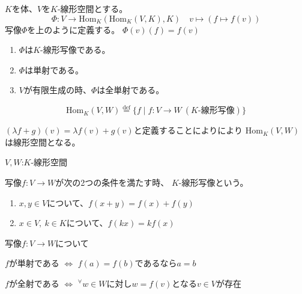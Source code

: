 \documentclass[12pt,b5paper]{ltjsarticle}
\begin{document}
$K$を体、$V$を$K$-線形空間とする。
\begin{equation}
 \Phi : V \rightarrow \mathrm{Hom}_K(\mathrm{Hom}_K(V,K),K)
  \quad
  v \mapsto (f\mapsto f(v))
\end{equation}
写像$\Phi$を上のように定義する。
$\Phi (v) (f) = f(v)$
\begin{enumerate}
 \item $\Phi$は$K$-線形写像である。
 \item $\Phi$は単射である。
 \item $V$が有限生成の時、$\Phi$は全単射である。
\end{enumerate}

\hrulefill

\begin{equation}
 \mathrm{Hom}_K(V,W)
  \stackrel{\mathrm{def}}{=}
  \{ f \mid f:V\rightarrow W \ (K\text{-線形写像}) \}
\end{equation}

$(\lambda f + g)(v) = \lambda f(v)+g(v)$と定義することによりにより
$\mathrm{Hom}_K(V,W)$は線形空間となる。


\dotfill

$V,W$:$K$-線形空間

写像$f: V\rightarrow W$が次の2つの条件を満たす時、
$K$-線形写像という。
\begin{enumerate}
 \item $x,y\in V$について、$f(x+y)=f(x)+f(y)$
 \item $x\in V,\ k\in K$について、$f(kx)=kf(x)$
\end{enumerate}

\dotfill

写像$f:V\rightarrow W$について

$f$が単射である
$\Leftrightarrow$
$f(a)=f(b)$であるなら$a=b$

$f$が全射である
$\Leftrightarrow$
${}^{\forall}w\in W$に対し$w=f(v)$となる$v\in V$が存在


\hrulefill
\end{document}
